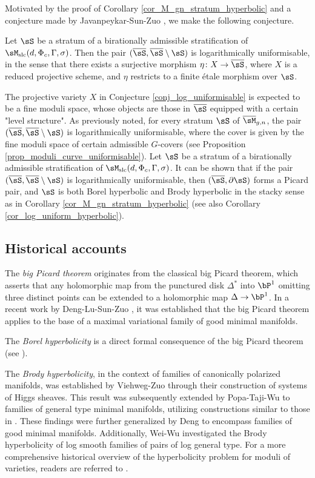 \documentclass[11pt,letterpaper]{amsart}
\numberwithin{equation}{section}
\begin{document}
    Motivated by the proof of Corollary \ref{cor_M_gn_stratum_hyperbolic} and a conjecture made by Javanpeykar-Sun-Zuo \cite[Conjecture 1.6]{JSZ2024}, we make the following conjecture.
    \begin{conj}\label{conj_log_uniformisable}
    	Let $\sS$ be a stratum of a birationally admissible stratification of $\sM_{\rm slc}(d, \Phi_c, \Gamma, \sigma)$. Then the pair $(\overline{\sS}, \overline{\sS} \setminus \sS)$ is logarithmically uniformisable, in the sense that there exists a surjective morphism $\eta \colon X \to \overline{\sS}$, where $X$ is a reduced projective scheme, and $\eta$ restricts to a finite \'etale morphism over $\sS$.
    \end{conj}
    The projective variety $X$ in Conjecture \ref{conj_log_uniformisable} is expected to be a fine moduli space, whose objects are those in $\overline{\sS}$ equipped with a certain "level structure". As previously noted, for every stratum $\sS$ of $\overline{\sM}_{g,n}$, the pair $(\overline{\sS}, \overline{\sS} \setminus \sS)$ is logarithmically uniformisable, where the cover is given by the fine moduli space of certain admissible $G$-covers (see Proposition \ref{prop_moduli_curve_uniformisable}). Let $\sS$ be a stratum of a birationally admissible stratification of $\sM_{\rm slc}(d, \Phi_c, \Gamma, \sigma)$. It can be shown that if the pair $(\overline{\sS}, \overline{\sS} \setminus \sS)$ is logarithmically uniformisable, then $(\overline{\sS}, \partial \sS)$ forms a Picard pair, and $\sS$ is both Borel hyperbolic and Brody hyperbolic in the stacky sense as in Corollary \ref{cor_M_gn_stratum_hyperbolic} (see also Corollary \ref{cor_log_uniform_hyperbolic}).
	\subsection{Historical accounts}
	The \emph{big Picard theorem} originates from the classical big Picard theorem, which asserts that any holomorphic map from the punctured disk $\Delta^\ast$ into $\bP^1$ omitting three distinct points can be extended to a holomorphic map $\Delta \to \bP^1$. In a recent work by Deng-Lu-Sun-Zuo \cite{DLSZ}, it was established that the big Picard theorem applies to the base of a maximal variational family of good minimal manifolds.  
	
	The \emph{Borel hyperbolicity} is a direct formal consequence of the big Picard theorem (see \cite[Theorem 3.13]{Javanpeykar2020}). 
	
	The \emph{Brody hyperbolicity}, in the context of families of canonically polarized manifolds, was established by Viehweg-Zuo \cite{VZ2003} through their construction of systems of Higgs sheaves. This result was subsequently extended by Popa-Taji-Wu \cite{PTW2019} to families of general type minimal manifolds, utilizing constructions similar to those in \cite{PS17}. These findings were further generalized by Deng \cite{Deng2022} to encompass families of good minimal manifolds. Additionally, Wei-Wu \cite{WeiWu2023} investigated the Brody hyperbolicity of log smooth families of pairs of log general type. For a more comprehensive historical overview of the hyperbolicity problem for moduli of varieties, readers are referred to \cite{DLSZ}.
	
\end{document}
